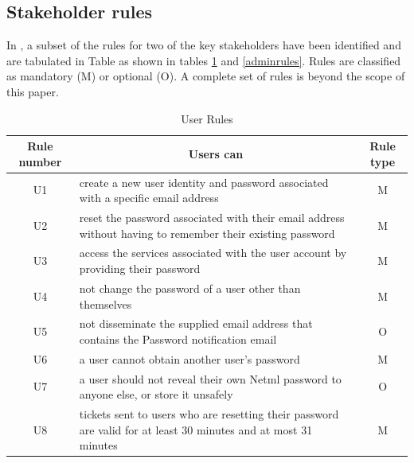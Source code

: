 \subsection{Stakeholder rules}\label{rules}

In \cite{sheniar2018experiments}, a subset of the rules for two of the key stakeholders have been
identified and are tabulated in Table  as
shown in tables \ref{Userrules} and   \ref{adminrules}.  Rules are classified as mandatory (M) 
or optional (O).  A complete set of rules is beyond the scope of this paper.

\begin{table}[!htbp]         %
\vspace{5mm}
	\begin{center}
\begin{tabular}{|c|p{4.2cm}|c|}
\hline 
 \textbf{ Rule number} & \multicolumn{1}{|c|}{\textbf{Users can}} & \textbf{Rule type}\\ 
\hline
U1 & create a new user identity and password associated with a specific email address & M  \\
\hline
U2 & reset the password associated with their email address without having to remember their existing password & M \\
\hline
U3 & access the services associated with the user account by providing their
password & M \\
\hline
U4 & not change the password of a user other than themselves & M  \\
\hline
U5 & not disseminate the supplied  email address that contains the  Password notification email & O \\
\hline 
U6 & a user cannot obtain another user's password &  M \\ 
\hline 
U7 & a user should not reveal their own Netml password to anyone else, or store it unsafely &  O \\ 
\hline 
U8 & tickets sent to users who are resetting their password are valid for at least 30 minutes and at most 31 minutes &  M \\ 
\hline 
	\end{tabular}
	\end{center}
	\caption{ User Rules }
\label{Userrules}
\end{table}


